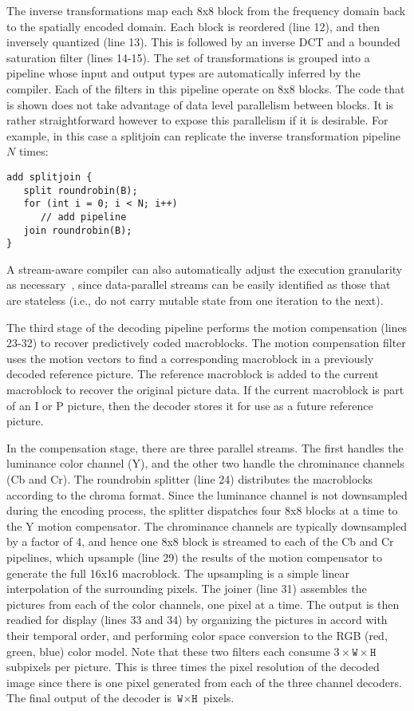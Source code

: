 The inverse transformations map each 8x8 block from the frequency
domain back to the spatially encoded domain. Each block is reordered
(line 12), and then inversely quantized (line 13). This is followed by
an inverse DCT and a bounded saturation filter (lines 14-15). The set
of transformations is grouped into a pipeline whose input
and output types are automatically inferred by the compiler. Each of
the filters in this pipeline operate on 8x8 blocks. The code that is
shown does not take advantage of data level parallelism between
blocks. It is rather straightforward however to expose this
parallelism if it is desirable. For example, in this case a splitjoin
can replicate the inverse transformation pipeline $N$ times:
\begin{center}
\begin{verbatim}
add splitjoin {
   split roundrobin(B);
   for (int i = 0; i < N; i++) 
      // add pipeline
   join roundrobin(B);
}
\end{verbatim}
\end{center}
A stream-aware compiler can also automatically adjust the execution
granularity as necessary~\cite{gordon02asplos}, since data-parallel streams
can be easily identified as those that are stateless (i.e., do not
carry mutable state from one iteration to the next).

The third stage of the decoding pipeline performs the motion
compensation (lines 23-32) to recover predictively coded
macroblocks. The motion compensation filter uses the motion vectors to
find a corresponding macroblock in a previously decoded reference
picture. The reference macroblock is added to the current macroblock
to recover the original picture data. If the current macroblock is
part of an I or P picture, then the decoder stores it for use as a
future reference picture.

In the compensation stage, there are three parallel streams.  The
first handles the luminance color channel (Y), and the other two
handle the chrominance channels (Cb and Cr). The roundrobin splitter
(line 24) distributes the macroblocks according to the chroma
format. Since the luminance channel is not downsampled during the
encoding process, the splitter dispatches four 8x8 blocks at a time to
the Y motion compensator. The chrominance channels are typically
downsampled by a factor of 4, and hence one 8x8 block is streamed to
each of the Cb and Cr pipelines, which upsample (line 29) the results
of the motion compensator to generate the full 16x16 macroblock.  The
upsampling is a simple linear interpolation of the surrounding pixels. 
The joiner (line 31) assembles the pictures from each of the color
channels, one pixel at a time. The output is then readied for display
(lines 33 and 34) by organizing the pictures in accord with their
temporal order, and performing color space conversion to the RGB (red,
green, blue) color model. Note that these two filters each consume
$3\times\texttt{W}\times\texttt{H}$ subpixels per picture. This is
three times the pixel resolution of the decoded image since there is
one pixel generated from each of the three channel decoders. The final
output of the decoder is $\texttt{W}\times\texttt{H}$ pixels.

